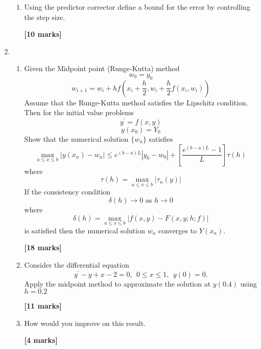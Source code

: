 \begin{enumerate}
\begin{enumerate}
\item
Using the predictor corrector define a bound for the error by controlling the
step size.
\begin{flushright}
\textbf{[10 marks]}
\end{flushright}
\end{enumerate}
\item
\begin{enumerate}
\item
Given the  Midpoint point (Runge-Kutta) method
\[w_0=y_0\]
\[w_{i+1}=w_{i}+hf(x_i+\frac{h}{2},w_i+\frac{h}{2}f(x_i,w_i) ) \]
Assume that the Runge-Kutta method satisfies the Lipschitz condition. Then
for the initial value problems
\[ y^{'}=f(x,y)\]
\[ y(x_0)=Y_0 \]
Show that the numerical solution $\{ w_n\}$ satisfies
\[ \max_{a\leq x\leq b}|y(x_n)-w_n| \leq e^{(b-a)L}|y_0-w_0|+\left[\frac{e^{(b-a)L}-1}{L} \right]\tau(h) \]
where
\[\tau(h) = \max_{a\leq x\leq b}|\tau_n(y)|\]
If the consistency condition 
\[ \delta(h) \rightarrow 0 \mbox{ as  } h\rightarrow 0 \]
where
\[\delta(h) = \max_{a \leq x \leq b}|f(x,y)-F(x,y;h;f)| \]
is satisfied then the numerical solution $w_n$ converges to $Y(x_n)$.
\begin{flushright}
\textbf{[18 marks]}
\end{flushright}
\item
Consider the differential equation
\[y^{'}-y+x-2=0, \ \ 0\leq x \leq 1, \ \ y(0)=0.\]
Apply the midpoint method to approximate the solution at $y(0.4)$ using $h=0.2$\\
\begin{flushright}
\textbf{[11 marks]}
\end{flushright}
\item
How would you improve on this result.
\begin{flushright}
\textbf{[4 marks]}
\end{flushright}
\end{enumerate}
\end{enumerate}

